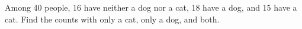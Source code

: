 Among 40 people, 16 have neither a dog nor a cat, 18 have a dog, and 15 have a cat. Find the counts with only a cat, only a dog, and both.
